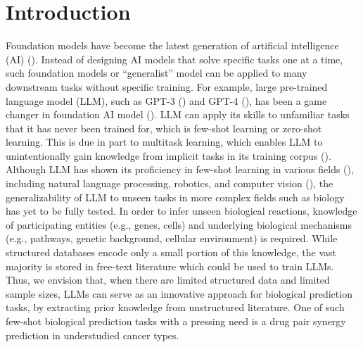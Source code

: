 \section{Introduction}

Foundation models have become the latest generation of artificial intelligence (AI) (\cite{Moor2023-dp}). Instead of designing AI models that solve specific tasks one at a time, such foundation models or ``generalist'' model can be applied to many downstream tasks without specific training. For example,  large pre-trained language model (LLM), such as GPT-3 (\cite{brown_language_2020}) and GPT-4 (\cite{OpenAI2023-ce}), has been a game changer in foundation AI model (\cite{Mitchell2023-cs}). LLM can apply its skills to unfamiliar tasks that it has never been trained for, which is few-shot learning or zero-shot learning. This is due in part to multitask learning, which enables LLM to unintentionally gain knowledge from implicit tasks in its training corpus (\cite{radford_language_nodate}). Although LLM has shown its proficiency in few-shot learning in various fields (\cite{brown_language_2020}), including natural language processing, robotics, and computer vision (\cite{veit_learning_2017, brown_language_2020, wertheimer_few-shot_2019}), the generalizability of LLM to unseen tasks in more complex fields such as biology has yet to be fully tested. In order to infer unseen biological reactions, knowledge of participating entities (e.g., genes, cells) and underlying biological mechanisms (e.g., pathways, genetic background, cellular environment) is required. While structured databases encode only a small portion of this knowledge, the vast majority is stored in free-text literature which could be used to train LLMs. Thus, we envision that, when there are limited structured data and limited sample sizes, LLMs can serve as an innovative approach for biological prediction tasks, by extracting prior knowledge from unstructured literature. One of such few-shot biological prediction tasks with a pressing need is a drug pair synergy prediction in understudied cancer types.  


